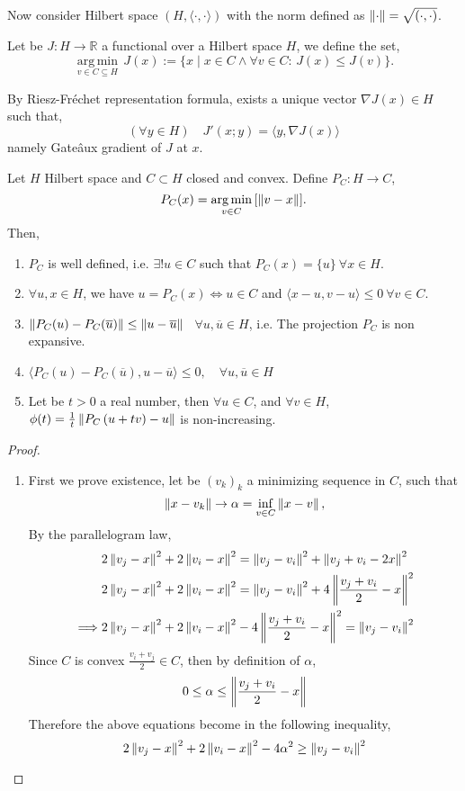 Now consider Hilbert space $(H, \langle \cdot,\cdot \rangle)$ with the norm defined as $\left\lVert\cdot\right\rVert=\sqrt{(\cdot,\cdot)}$.

Let be $J: H\rightarrow \mathbb{R}$ a functional over a Hilbert space $H$, we define the set,
\[
{\displaystyle {\underset {v\in C\subseteq H}{\operatorname {arg\,min} }}\,J(x):=\{x\mid x\in C\wedge \forall v\in C:\,J(x)\leq J(v)\}.}\]


By Riesz-Fr\'echet representation formula, exists a unique vector $\nabla J(x) \in H$ such that, 
\[
(\forall y \in H) \quad J'(x; y)=\langle y, \nabla J(x)\rangle
\]
namely Gate\^aux gradient of $J$ at $x$. 

\begin{lemma}
\label{lemma3. Projection}
Let $H$ Hilbert space and $C\subset H$ closed and convex. Define $P_C: H\rightarrow C$, \[P_C(x)={\displaystyle {\underset {v\in C}{\operatorname {arg\,min} }}\left[\left\lVert v-x\right\rVert\right]}.\]
Then,
\begin{enumerate}
	\item $P_C$ is well defined, i.e. $\exists !u \in C$ such that $P_C(x)=\{u\} \ \forall x \in H$.
	\item $\forall u,x\in H$, we have $u=P_C(x) \iff u\in C$  and  $\langle x-u, v-u\rangle\leq 0\ \forall v \in C$.
	\item $\left\lVert P_C(u)-P_C(\overline{u})\right\rVert\leq \left\lVert u-\overline{u}\right\rVert$ \ $\forall u, \overline{u} \in H$, i.e. The projection $P_C$ is non expansive.
	\item $\langle P_C(u)-P_C(\overline{u}), u-\overline{u}\rangle \leq 0, \quad \forall u, \overline{u}\in H$
	\item Let be $t>0$ a real number, then $\forall u \in C$, and $\forall v\in H$, $\phi(t)=\frac{1}{t}\left\lVert P_C\left(u+tv\right)-u\right\rVert$ is non-increasing.
\end{enumerate}
\begin{proof}
	\begin{enumerate}
		\item First we prove existence, let be $(v_k)_k$ a minimizing sequence in $C$, such that
		\[
			\left\lVert x-v_k\right\rVert\rightarrow \alpha=\inf_{v \in C}\left\lVert x-v\right\rVert,
		\]
		By the parallelogram law,
		\begin{align*}
			&2\left\lVert v_j-x\right\rVert^2+2\left\lVert v_i-x\right\rVert^2= \left\lVert v_j-v_i\right\rVert^2+\left\lVert v_j+v_i-2x\right\rVert^2 \\
			&2\left\lVert v_j-x\right\rVert^2+2\left\lVert v_i-x\right\rVert^2= \left\lVert v_j-v_i\right\rVert^2+4\left\lVert\frac{v_j+v_i}{2}-x\right\rVert^2\\
	\implies&2\left\lVert v_j-x\right\rVert^2+2\left\lVert v_i-x\right\rVert^2-4\left\lVert\frac{v_j+v_i}{2}-x\right\rVert^2=\left\lVert v_j-v_i\right\rVert^2
		\end{align*}
		Since $C$ is convex $\frac{v_i+v_j}{2} \in C$, then by definition of $\alpha$,
		\[
		0\leq \alpha \leq \left\lVert\frac{v_j+v_i}{2}-x\right\rVert
		\]  
		Therefore the above equations become in the following inequality,
		\[
		2\left\lVert v_j-x\right\rVert^2+2\left\lVert v_i-x\right\rVert^2-4\alpha^2\geq \left\lVert v_j-v_i\right\rVert^2
		\]
		

\end{enumerate}
\end{proof}
\end{lemma}
